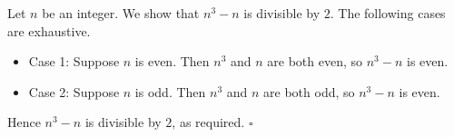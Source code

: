 Let $n$ be an integer.
We show that $n^{3} - n$ is divisible by $2$.
The following cases are exhaustive.

\begin{itemize}
  \item Case 1: Suppose $n$ is even.
    Then $n^{3}$ and $n$ are both even, so $n^{3} - n$ is even.
  \item Case 2: Suppose $n$ is odd.
    Then $n^{3}$ and $n$ are both odd, so $n^{3} - n$ is even.
\end{itemize}

Hence $n^{3} - n$ is divisible by $2$, as required. \hfill$\square$